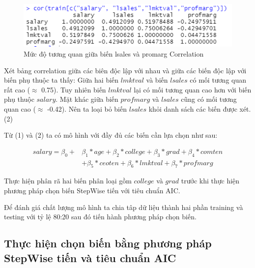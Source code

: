 \begin{figure}[!h]
	\centering
	\includegraphics[scale = 0.6]{../Photo Of Result/B1_CorTable.PNG}  
	\caption{Mức độ tương quan giữa biến lsales và promarg Correlation}
	\label{fig-b1:corr-table}
\end{figure}

Xét bảng correlation giữa các biên độc lập với nhau và giữa các biến độc lập với biến phụ thuộc ta thấy: Giữa hai biến $\textit{lmktval}$ và biến $\textit{lsales}$ có mối tương quan rất cao ($\approx$ 0.75). Tuy nhiên biến $\textit{lmktval}$ lại có mối tương quan cao hơn với biến phụ thuộc $\textit{salary}$. Mặt khác giữa biến $\textit{profmarg}$ và $\textit{lsales}$ cũng có mối tương quan cao ($\approx$ -0.42). Nên ta loại bỏ biến $\textit{lsales}$ khỏi danh sách các biến được xét. (2)

Từ (1) và (2) ta có mô hình với đầy đủ các biến cần lựa chọn như sau:

\begin{equation}\label{eq-b1:full-model}
	\begin{split}
		salary 	= \beta_0 + &\beta_1*age + \beta_2*college + \beta_3*grad + \beta_4*comten\\
		&+ \beta_5*ceoten + \beta_6*lmktval + \beta_7*profmarg
	\end{split}
\end{equation}


Thực hiện phân rã hai biến phân loại gồm $college$ và $grad$ trước khi thực hiện phương pháp chọn biến StepWise tiến với tiêu chuẩn AIC.

Để đánh giá chất lượng mô hình ta chia tâp dữ liệu thành hai phần training và testing với tỷ lệ 80:20 sau đó tiến hành phương pháp chọn biến.

\subsection*{Thực hiện chọn biến bằng phương pháp StepWise tiến và tiêu chuẩn AIC}

